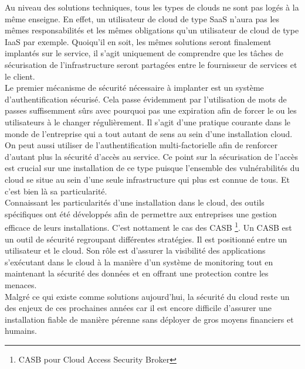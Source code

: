 \documentclass[a4paper, 12pt]{article}
\begin{document}
      Au niveau des solutions techniques, tous les types de clouds ne sont pas
      logés à la même enseigne. En effet, un utilisateur de cloud de type SaaS
      n'aura pas les mêmes responsabilités et les mêmes obligations qu'un
      utilisateur de cloud de type IaaS par exemple. Quoiqu'il en soit, les
      mêmes solutions seront finalement implantés sur le service, il s'agit
      uniquement de comprendre que les tâches de sécurisation de
      l'infrastructure seront partagées entre le fournisseur de services et
      le client. \\

      Le premier mécanisme de sécurité nécessaire à implanter est un système
      d'authentification sécurisé. Cela passe évidemment par l'utilisation
      de mots de passes suffisemment sûrs avec pourquoi pas une expiration
      afin de forcer le ou les utilisateurs à le changer régulièrement. Il
      s'agit d'une pratique courante dans le monde de l'entreprise qui a tout
      autant de sens au sein d'une installation cloud. On peut aussi utiliser
      de l'authentification multi-factorielle afin de renforcer d'autant plus
      la sécurité d'accès au service. Ce point sur la sécurisation de l'accès
      est crucial sur une installation de ce type puisque l'ensemble des
      vulnérabilités du cloud se situe au sein d'une seule infrastructure
      qui plus est connue de tous. Et c'est bien là sa particularité. \\

      Connaissant les particularités d'une installation dans le cloud, des
      outils spécifiques ont été développés afin de permettre aux entreprises
      une gestion efficace de leurs installations. C'est nottament le cas des
      CASB \footnote{CASB pour Cloud Access Security Broker}. Un CASB est un
      outil de sécurité regroupant différentes stratégies. Il est positionné
      entre un utilisateur et le cloud. Son rôle est d'assurer la visibilité
      des applications s'exécutant dans le cloud à la manière d'un système de
      monitoring tout en maintenant la sécurité des données et en offrant une
      protection contre les menaces. \\

      Malgré ce qui existe comme solutions aujourd'hui, la sécurité du cloud
      reste un des enjeux de ces prochaines années car il est encore difficile
      d'assurer une installation fiable de manière pérenne sans déployer de
      gros moyens financiers et humains.
\end{document}
